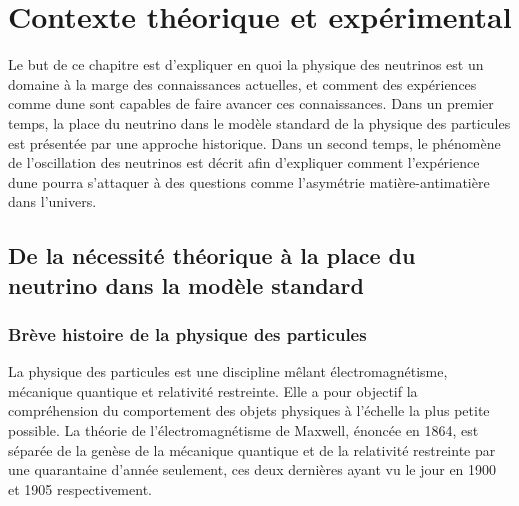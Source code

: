 \chapter{Contexte théorique et expérimental}
    
    Le but de ce chapitre est d'expliquer en quoi la physique des neutrinos est un domaine à la marge des connaissances actuelles, et comment des expériences comme \gls{dune} sont capables de faire avancer ces connaissances. Dans un premier temps, la place du neutrino dans le modèle standard de la physique des particules est présentée par une approche historique. Dans un second temps, le phénomène de l'oscillation des neutrinos est décrit afin d'expliquer comment l'expérience \gls{dune} pourra s'attaquer à des questions comme l'asymétrie matière-antimatière dans l'univers.
    
    \section{De la nécessité théorique à la place du neutrino dans la modèle standard}
    
	    \subsection{Brève histoire de la physique des particules}
	    
		    La physique des particules est une discipline mêlant électromagnétisme, mécanique quantique et relativité restreinte. Elle a pour objectif la compréhension du comportement des objets physiques à l'échelle la plus petite possible. La théorie de l'électromagnétisme de Maxwell, énoncée en 1864\cite{Maxwell1865}, est séparée de la genèse de la mécanique quantique et de la relativité restreinte par une quarantaine d'année seulement, ces deux dernières ayant vu le jour en 1900 et 1905 respectivement. 
		    
